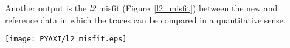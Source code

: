 \noindent Another output is the \textit{l2} misfit (Figure~\ref{l2_misfit}) between the new and reference data 
in which the traces can be compared in a quantitative sense.

\begin{figure*}[htb]
\begin{center}
\texttt{[image: PYAXI/l2\_misfit.eps]}
\caption{\textit{l2 misfit between the new and reference data.}}
\end{center}
\label{l2_misfit}
\end{figure*}
